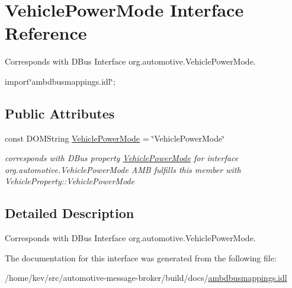 \hypertarget{interfaceVehiclePowerMode}{\section{Vehicle\+Power\+Mode Interface Reference}
\label{interfaceVehiclePowerMode}
}


Corresponds with D\+Bus Interface org.\+automotive.\+Vehicle\+Power\+Mode.  




{\ttfamily import\char`\"{}ambdbusmappings.\+idl\char`\"{};}

\subsection*{Public Attributes}
\begin{DoxyCompactItemize}
\item 
\hypertarget{interfaceVehiclePowerMode_a2c1c72402fa6c44c2bc9e8fd68bdc190}{const D\+O\+M\+String \hyperlink{interfaceVehiclePowerMode_a2c1c72402fa6c44c2bc9e8fd68bdc190}{Vehicle\+Power\+Mode} = \char`\"{}Vehicle\+Power\+Mode\char`\"{}}\label{interfaceVehiclePowerMode_a2c1c72402fa6c44c2bc9e8fd68bdc190}

\begin{DoxyCompactList}\small\item\em corresponds with D\+Bus property \hyperlink{interfaceVehiclePowerMode}{Vehicle\+Power\+Mode} for interface org.\+automotive.\+Vehicle\+Power\+Mode A\+M\+B fulfills this member with Vehicle\+Property\+::\+Vehicle\+Power\+Mode \end{DoxyCompactList}\end{DoxyCompactItemize}


\subsection{Detailed Description}
Corresponds with D\+Bus Interface org.\+automotive.\+Vehicle\+Power\+Mode. 

The documentation for this interface was generated from the following file\+:\begin{DoxyCompactItemize}
\item 
/home/kev/src/automotive-\/message-\/broker/build/docs/\hyperlink{ambdbusmappings_8idl}{ambdbusmappings.\+idl}\end{DoxyCompactItemize}
